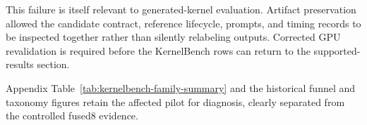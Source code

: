 This failure is itself relevant to generated-kernel evaluation. Artifact preservation allowed the candidate contract, reference lifecycle, prompts, and timing records to be inspected together rather than silently relabeling outputs. Corrected GPU revalidation is required before the KernelBench rows can return to the supported-results section.

Appendix Table~\ref{tab:kernelbench-family-summary} and the historical funnel and taxonomy figures retain the affected pilot for diagnosis, clearly separated from the controlled fused8 evidence.

\FloatBarrier
